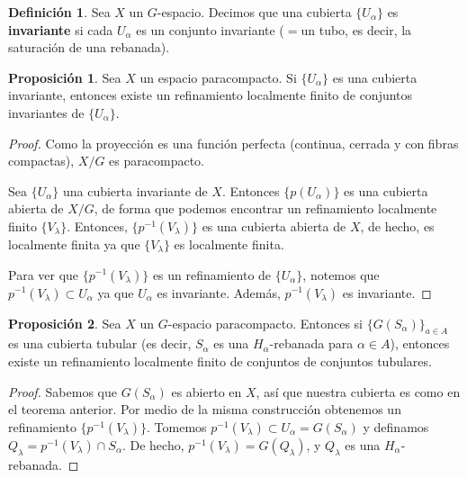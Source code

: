\documentclass[spanish]{article}
\theoremstyle{definition}
\newtheorem*{defn}{Definición}
\newtheorem*{prop}{Proposición}
\begin{document}
\begin{defn}
	Sea $X$ un $G$-espacio. Decimos que una cubierta $\{U_\alpha\}$ es \textbf{invariante} si cada $U_\alpha$ es un conjunto invariante ($=$un tubo, es decir, la saturación de una rebanada).
\end{defn}

\begin{prop}
	Sea $X$ un espacio paracompacto. Si $\{U_\alpha\}$ es una cubierta invariante, entonces existe un refinamiento localmente finito de conjuntos invariantes de $\{U_\alpha\}$.
\end{prop}
\begin{proof}
	Como la proyección es una función perfecta (continua, cerrada y con fibras compactas), $X/G$ es paracompacto.
	
	Sea $\{U_\alpha\}$ una cubierta invariante de $X$. Entonces $\{p(U_\alpha)\}$ es una cubierta abierta de $X/G$, de forma que podemos encontrar un refinamiento localmente finito $\{V_\lambda\}$. Entonces, $\{p^{-1}(V_\lambda)\}$ es una cubierta abierta de $X$, de hecho, es localmente finita ya que $\{V_\lambda\}$ es localmente finita.
	
	Para ver que $\{p^{-1}(V_\lambda)\}$ es un refinamiento de $\{U_\alpha\}$, notemos que $p^{-1}(V_\lambda)\subset U_\alpha$ ya que $U_\alpha$ es invariante. Además, $p^{-1}(V_\lambda)$ es invariante.
\end{proof}

\begin{prop}
	Sea $X$ un $G$-espacio paracompacto. Entonces si $\{G(S_\alpha)\}_{a\in A}$ es una cubierta tubular (es decir, $S_\alpha$ es una $H_\alpha$-rebanada para $\alpha\in A$), entonces existe un refinamiento localmente finito de conjuntos de conjuntos tubulares.
\end{prop}
\begin{proof}
	Sabemos que $G(S_\alpha)$ es abierto en $X$, así que nuestra cubierta es como en el teorema anterior. Por medio de la misma construcción obtenemos un refinamiento $\{p^{-1}(V_\lambda)\}$. Tomemos $p^{-1}(V_\lambda)\subset U_\alpha=G(S_\alpha)$ y definamos $Q_\lambda=p^{-1}(V_\lambda)\cap S_\alpha$. De hecho, $p^{-1}(V_\lambda)=G(Q_\lambda)$, y $Q_\lambda$ es una $H_\alpha$-rebanada.
\end{proof}
\end{document}
